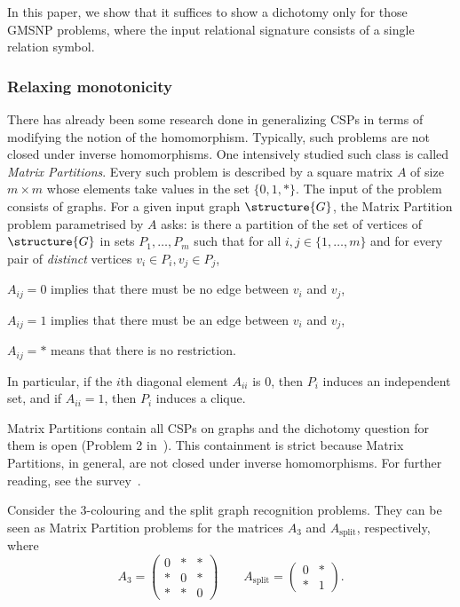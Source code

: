 \documentclass{lmcs}
\begin{document}
In this paper, we show that it suffices to show a dichotomy only for those GMSNP problems, where the input relational signature consists of a single relation symbol.



\subsubsection*{Relaxing monotonicity}

There has already been some research done in generalizing CSPs in terms of modifying the notion of the homomorphism.
%
Typically, such problems are not closed under inverse homomorphisms.
%
One intensively studied such class is called \emph{Matrix Partitions}.
%
Every such problem is described by a square matrix $A$ of size $m\times m$ whose elements take values in the set $\{0,1,\ast\}$.
%
The input of the problem consists of graphs.
%
For a given input graph $\structure{G}$, the Matrix Partition problem parametrised by $A$ asks: is there a partition of the set of vertices of $\structure{G}$ in sets $P_1,\ldots,P_m$ such that for all $i,j\in\{1,\ldots,m\}$ and for every pair of \emph{distinct} vertices $v_i\in P_i,v_j\in P_j$,
\begin{compactitem}
\item $A_{ij}=0$ implies that there must be no edge between $v_i$ and $v_j$,
\item $A_{ij}=1$ implies that there must be an edge between $v_i$ and $v_j$,
\item $A_{ij}=\ast$ means that there is no restriction.
\end{compactitem}
In particular, if the $i$th diagonal element $A_{ii}$ is $0$, then $P_i$ induces an independent set, and if $A_{ii}=1$, then $P_i$ induces a clique.

Matrix Partitions contain all CSPs on graphs and the dichotomy question for them is open (Problem 2 in~\cite{hell2014}).
%
This containment is strict because Matrix Partitions, in general, are not closed under inverse homomorphisms.
%
For further reading, see the survey~\cite{hell2014}.
\begin{exa}
Consider the 3-colouring and the split graph recognition problems.
%
They can be seen as Matrix Partition problems for the matrices $A_3$ and $A_{\mathrm{split}}$, respectively, where
\begin{equation*}
A_3 = \begin{pmatrix}0 & \ast & \ast\\ \ast & 0 & \ast\\ \ast & \ast & 0\end{pmatrix}\qquad A_{\mathrm{split}} = \begin{pmatrix}0 & \ast\\ \ast & 1\end{pmatrix}.
\end{equation*}
\end{exa}
\end{document}
